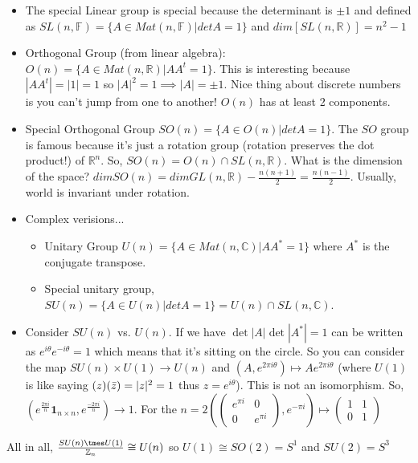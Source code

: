 \documentclass[12pt,letterpaper]{article}
\begin{document}
\begin{itemize}
    \item The special Linear group is special because the determinant is $\pm 1$ and defined as $SL(n, \mathbb{F}) = \{ A \in Mat(n, \mathbb{F}) | det A = 1\}$ and $dim[SL(n, \mathbb{R}) ] = n^2 -1$
    \item Orthogonal Group (from linear algebra): $O(n) = \{ A \in Mat(n, \mathbb{R})| AA^t =1\}$. This is interesting because $|AA^t| = |1| = 1$ so $|A|^2 = 1 \implies |A| = \pm 1$. Nice thing about discrete numbers is you can't jump from one to another! $O(n)$ has at least 2 components. 
    \item Special Orthogonal Group $SO(n) = \{ A \in O(n) | det A = 1\}$. The $SO$ group is famous because it's just a rotation group (rotation preserves the dot product!) of $\mathbb{R}^n$. So, $SO(n) = O(n) \cap SL(n, \mathbb{R})$. What is the dimension of the space? $dim SO(n) = dim GL(n, \mathbb{R}) - \frac{n(n+1)}{2} = \frac{n(n-1)}{2}$. Usually, world is invariant under rotation. 
    \item Complex verisions...
    \begin{itemize}
        \item Unitary Group $U(n) = \{ A \in Mat(n, \mathbb{C}) | AA^*=1\}$ where $A^* $ is the conjugate transpose.
        \item Special unitary group, $SU(n) = \{ A \in U(n)| detA =1\} = U(n) \cap SL(n, \mathbb{C})$.
    \end{itemize}
    \item Consider $SU(n)$ vs. $U(n)$. If we have $\det|A|\det|A^*| = 1$ can be written as $e^{i \theta}e^{-i\theta} = 1$ which means that it's sitting on the circle. So you can consider the map $SU(n) \times U(1) \rightarrow U(n)$ and $(A, e^{2\pi i \theta }) \mapsto A e^{2 \pi i \theta}$ (where $U(1)$ is like saying $(z)(\Bar{z}) = |z|^2 = 1$ thus $z = e^{i \theta}$). This is not an isomorphism. So, $(e^{\frac{2 \pi i}{n}} \mathbf{1}_{n \times n}, e^{\frac{-2 \pi i}{n}}) \rightarrow 1.$ For the $n=2(\begin{pmatrix}
e^{\pi i } & 0\\
0 & e^{\pi i }
\end{pmatrix}, e^{-\pi i }) \mapsto \begin{pmatrix}
1 & 1\\
0 & 1
\end{pmatrix}$
\end{itemize}
 All in all, $\frac{SU(n) \tmes U(1) }{\mathbb{Z}_n} \cong U(n)$ so $U(1) \cong SO(2) = S^1$ and $SU(2) = S^3$
\end{document}
